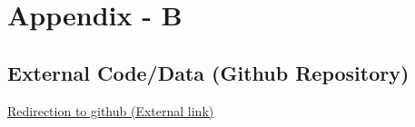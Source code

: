 \chapter{Appendix - B}
\label{chapter:Appendix-B}

\section{External Code/Data (Github Repository)}
\href{https://github.com/Miyanooooo/}{Redirection to github (External link)}

